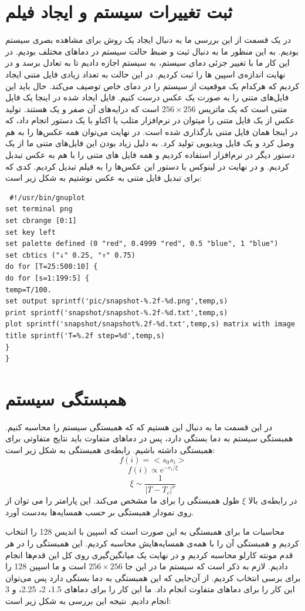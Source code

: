 \documentclass[a4paper,12pt]{article}
\begin{document}
\section{ثبت تغییرات سیستم و ایجاد فیلم }
در یک قسمت از این بررسی ما به دنبال ایجاد یک روش برای مشاهده بصری سیستم بودیم.
به این منظور ما به دنبال ثبت و ضبظ حالت سیستم در دما‌های مختلف بودیم.
در این کار ما با تغییر جزئی دمای سیستم، به سیستم اجازه دادیم تا به تعادل برسد
و در نهایت اندازه‌ی اسپین ها را ثبت کردیم.
در این حالت به تعداد زیادی فایل متنی ایجاد کردیم که هرکدام یک موقعیت از
سیستم را در دمای خاص توصیف می‌کند.
حال باید این فایل‌های متنی را به صورت یک عکس درست کنیم.
فایل ایجاد شده در اینجا یک فایل متنی است که یک ماتریس
$256\times256$
است که درایه‌های آن صفر و یک هستند.
تولید عکس از یک فایل متنی را میتوان در نرم‌افزار متلب یا اکتاو با یک دستور
انجام داد، که
در اینجا همان فایل متنی بارگذاری شده است.
در نهایت می‌توان همه عکس‌ها را به هم وصل کرد و یک فایل ویدیویی
تولید کرد.
به دلیل زیاد بودن این فایل‌های متنی ما از
یک دستور دیگر در نرم‌افزار
استفاده کردیم و همه فایل های متنی را با هم به عکس تبدبل کردیم.
و در نهایت در لینوکس با دستور
این عکس‌ها را به فیلم تبدیل کردیم.
کدی که برای تبدیل فایل متنی به عکس نوشتیم به شکل زیر است:
\begin{lstlisting}
 #!/usr/bin/gnuplot
set terminal png
set cbrange [0:1]
set key left
set palette defined (0 "red", 0.4999 "red", 0.5 "blue", 1 "blue")
set cbtics ("↓" 0.25, "↑" 0.75)
do for [T=25:500:10] {
do for [s=1:199:5] {
temp=T/100.
set output sprintf('pic/snapshot-%.2f-%d.png',temp,s)
print sprintf('snapshot/snapshot-%.2f-%d.txt',temp,s)
plot sprintf('snapshot/snapshot%.2f-%d.txt',temp,s) matrix with image title sprintf('T=%.2f step=%d',temp,s)
}
}
\end{lstlisting}

\section{همبستگی سیستم}
در این قسمت ما به دنبال این هستیم که که همبستگی سیستم را محاسبه کنیم.
همبستگی سیستم به دما بستگی دارد، پس در دما‌های متفاوت باید
نتایج متفاوتی برای همبستگی داشته باشیم.
رابطه‌ی همبستگی به شکل زیر است:
$$
f(i)=<s_0s_i>
$$
$$
f(i)\propto e^{-r_i/\xi}
$$
$$
\xi\sim\frac{1}{|T-T_c|^\nu}
$$
در رابطه‌ی بالا
$\xi$
ظول همبستگی را برای ما مشخص می‌کند.
این پارامتر را می توان از روی نمودار همبستگی بر حسب همسایه‌ها
به‌دست آورد.

محاسبات ما برای همبستگی به این صورت است که اسپین با 
اندیس 128 را انتخاب کردیم و همبستگی آن را با همه‌ی
همسایه‌هایش محاسبه کردیم.
این همبستگی را در هر قدم مونته کارلو محاسبه کردیم و در نهایت یک میانگین‌گیری
روی کل این قدم‌ها انجام دادیم.
لازم به ذکر است که سیستم ما در این جا
$256\times256$
است و ما اسپین 128 را برای برسی انتخاب کردیم.
از آن‌جایی که این همبستگی به دما بستگی دارد
 پس می‌توان این کار را برای دماهای متفاوت انجام داد.
 ما این کار را برای دماهای 1.5، 2، 2.25، و 3 انجام دادیم.
 نتیجه این بررسی به شکل زیر است:
\end{document}
